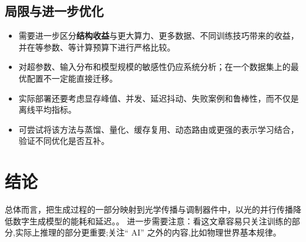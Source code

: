 \documentclass[UTF8,11pt,a4paper]{ctexart}
\newcommand{\term}[1]{\textbf{\textcolor{mainblue}{#1}}}
\begin{document}
\subsection{局限与进一步优化}
\begin{itemize}
\item 需要进一步区分\term{结构收益}与更大算力、更多数据、不同训练技巧带来的收益，并在等参数、等计算预算下进行严格比较。
\item 对超参数、输入分布和模型规模的敏感性仍应系统分析；在一个数据集上的最优配置不一定能直接迁移。
\item 实际部署还要考虑显存峰值、并发、延迟抖动、失败案例和鲁棒性，而不仅是离线平均指标。
\item 可尝试将该方法与蒸馏、量化、缓存复用、动态路由或更强的表示学习结合，验证不同优化是否互补。
\end{itemize}

\section{结论}
总体而言，把生成过程的一部分映射到光学传播与调制器件中，以光的并行传播降低数字生成模型的能耗和延迟。。 进一步需要注意：看这文章容易只关注训练的部分,实际上推理的部分更重要;关注“ AI” 之外的内容,比如物理世界基本规律。
\end{document}
